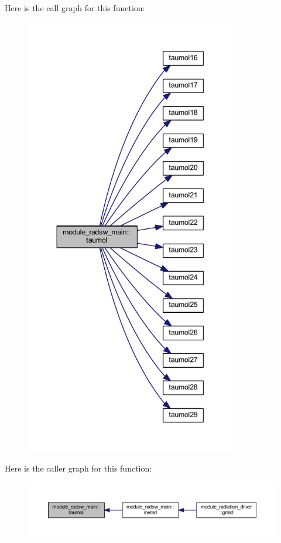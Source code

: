 Here is the call graph for this function\+:\nopagebreak
\begin{figure}[H]
\begin{center}
\leavevmode
\includegraphics[height=550pt]{group__module__radsw__main_gaafef1e054b5103007f57129c07fcba81_cgraph}
\end{center}
\end{figure}




Here is the caller graph for this function\+:
\nopagebreak
\begin{figure}[H]
\begin{center}
\leavevmode
\includegraphics[width=350pt]{group__module__radsw__main_gaafef1e054b5103007f57129c07fcba81_icgraph}
\end{center}
\end{figure}


